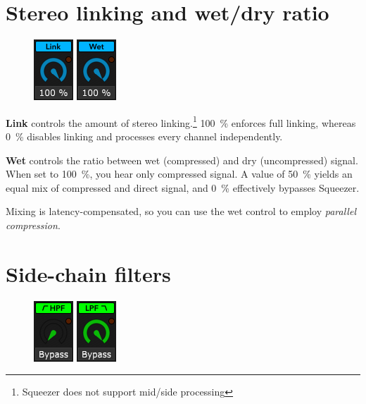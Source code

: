 \section{Stereo linking and wet/dry ratio}

\begin{figure}
  \includegraphics[scale=\screenshotscale,clip]{include/images/knob_stereo_link.png}
  \includegraphics[scale=\screenshotscale,clip]{include/images/knob_wet_dry.png}
\end{figure}

\textbf{Link} controls the amount of stereo linking.\footnote{Squeezer
  does not support mid/side processing} \SI{100}{\percent} enforces
full linking, whereas \SI{0}{\percent} disables linking and processes
every channel independently.

\textbf{Wet} controls the ratio between wet (compressed) and dry
(uncompressed) signal.  When set to \SI{100}{\percent}, you hear only
compressed signal.  A value of \SI{50}{\percent} yields an equal mix
of compressed and direct signal, and \SI{0}{\percent} effectively
bypasses Squeezer.

Mixing is latency-compensated, so you can use the wet control to
employ \emph{parallel compression}.

\section{Side-chain filters}

\begin{figure}
  \includegraphics[scale=\screenshotscale,clip]{include/images/knob_hpf_cutoff.png}
  \includegraphics[scale=\screenshotscale,clip]{include/images/knob_lpf_cutoff.png}
\end{figure}

